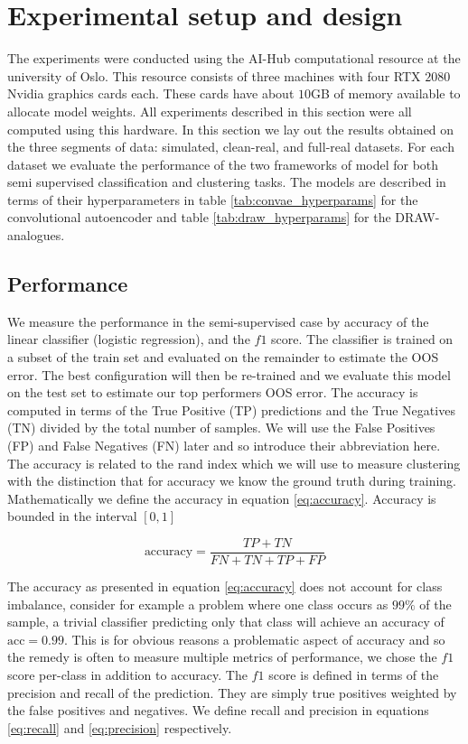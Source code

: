 \section{Experimental setup and design}

The experiments were conducted using the AI-Hub computational resource at the university of Oslo.  This resource consists of three machines with four RTX $2080$ Nvidia graphics cards each. These cards have about $10$GB of memory available to allocate model weights. All experiments described in this section were all computed using this hardware. In this section we lay out the results obtained on the three segments of data: simulated, clean-real, and full-real datasets. For each dataset we evaluate the performance of the two frameworks of model for both semi supervised classification and clustering tasks. The models are described in terms of their hyperparameters in table \ref{tab:convae_hyperparams} for the convolutional autoencoder and table \ref{tab:draw_hyperparams} for the DRAW-analogues. 

\subsection{Performance}

We measure the performance in the semi-supervised case by accuracy of the linear classifier (logistic regression), and the $f1$ score. The classifier is trained on a subset of the train set and evaluated on the remainder to estimate the OOS error. The best configuration will then be re-trained and we evaluate this model on the test set to estimate our top performers OOS error. The accuracy is computed in terms of  the True Positive (TP) predictions and the True Negatives (TN) divided by the total number of samples. We will use the False Positives (FP) and False Negatives (FN) later and so introduce their abbreviation here. The accuracy is related to the rand index which we will use to measure clustering with the distinction that for accuracy we know the ground truth during training. Mathematically we define the accuracy in equation \ref{eq:accuracy}. Accuracy is bounded in the interval $[0, 1]$

\begin{equation}\label{eq:accuracy}
\text{accuracy} = \frac{TP + TN}{FN+ TN + TP+FP}
\end{equation}

\noindent The accuracy as presented in equation \ref{eq:accuracy} does not account for class imbalance, consider for example a problem where one class occurs as $99\%$ of the sample, a trivial classifier predicting only that class will achieve an accuracy of $\text{acc}=0.99$. This is for obvious reasons a problematic aspect of accuracy and so the remedy is often to measure multiple metrics of performance, we chose the $f1$ score per-class in addition to accuracy. The $f1$ score is defined in terms of the precision and recall of the prediction. They are simply true positives weighted by the false positives and negatives. We define recall and precision in equations \ref{eq:recall} and \ref{eq:precision} respectively.

